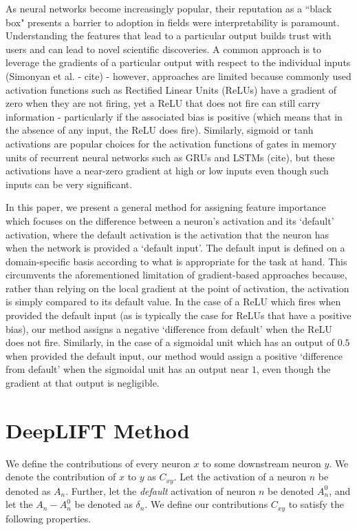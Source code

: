 \documentclass{article}
\begin{document}
As neural networks become increasingly popular, their reputation as a ``black box" presents a barrier to adoption in fields were interpretability is paramount. Understanding the features that lead to a particular output builds trust with users and can lead to novel scientific discoveries. A common approach is to leverage the gradients of a particular output with respect to the individual inputs (Simonyan et al. - cite) - however, approaches are limited because commonly used activation functions such as Rectified Linear Units (ReLUs) have a gradient of zero when they are not firing, yet a ReLU that does not fire can still carry information - particularly if the associated bias is positive (which means that in the absence of any input, the ReLU does fire). Similarly, sigmoid or tanh activations are popular choices for the activation functions of gates in memory units of recurrent neural networks such as GRUs and LSTMs (cite), but these activations have a near-zero gradient at high or low inputs even though such inputs can be very significant.

In this paper, we present a general method for assigning feature importance which focuses on the difference between a neuron's activation and its `default' activation, where the default activation is the activation that the neuron has when the network is provided a `default input'. The default input is defined on a domain-specific basis according to what is appropriate for the task at hand. This circumvents the aforementioned limitation of gradient-based approaches because, rather than relying on the local gradient at the point of activation, the activation is simply compared to its default value. In the case of a ReLU which fires when provided the default input (as is typically the case for ReLUs that have a positive bias), our method assigns a negative `difference from default' when the ReLU does not fire. Similarly, in the case of a sigmoidal unit which has an output of $0.5$ when provided the default input, our method would assign a positive `difference from default' when the sigmoidal unit has an output near $1$, even though the gradient at that output is negligible.

\section{DeepLIFT Method}
\label{DeepLIFT}

We define the contributions of every neuron $x$ to some downstream neuron $y$. We denote the contribution of $x$ to $y$ as $C_{xy}$. Let the activation of a neuron $n$ be denoted as $A_n$. Further, let the \emph{default} activation of neuron $n$ be denoted $A_n^0$, and let the $A_n - A_n^0$ be denoted as $\delta_n$. We define our contributions $C_{xy}$ to satisfy the following properties.
\end{document}
